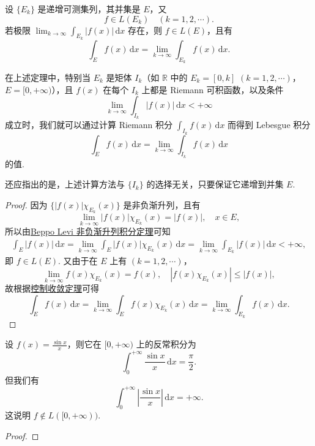 \documentclass[../../main.tex]{subfiles}%
\begin{document}
\begin{theorem}
设 \( \{ E_k \} \) 是递增可测集列，其并集是 \( E \)，又
\[
f \in L(E_k) \quad (k = 1, 2, \cdots).
\]
若极限 \( \lim_{k \to \infty} \int_{E_k} |f(x)| \, \mathrm{d}x \) 存在，则 \( f \in L(E) \)，且有
\[
\int_E f(x) \, \mathrm{d}x = \lim_{k \to \infty} \int_{E_k} f(x) \, \mathrm{d}x.
\]
\end{theorem}
\begin{remark}
在上述定理中，特别当 \( E_k \) 是矩体 \( I_k \)（如 \( \mathbb{R} \) 中的 \( E_k = [0, k] \) \( (k = 1, 2, \cdots) \)，\( E = [0, +\infty) \)），且 \( f(x) \) 在每个 \( I_k \) 上都是 Riemann 可积函数，以及条件
\[
\lim_{k \to \infty} \int_{I_k} |f(x)| \, \mathrm{d}x < +\infty
\]
成立时，我们就可以通过计算 Riemann 积分 \( \int_{I_k} f(x) \, \mathrm{d}x \) 而得到 Lebesgue 积分
\[
\int_E f(x) \, \mathrm{d}x = \lim_{k \to \infty} \int_{I_k} f(x) \, \mathrm{d}x
\]
的值.

还应指出的是，上述计算方法与 \( \{ I_k \} \) 的选择无关，只要保证它递增到并集 \( E \).
\end{remark}
\begin{proof}
因为 \( \{ |f(x)| \chi_{E_k}(x) \} \) 是非负渐升列，且有
\[
\lim_{k \to \infty} |f(x)| \chi_{E_k}(x) = |f(x)|, \quad x \in E,
\]
所以由\hyperref[theorem:Beppo Levi非负渐升列积分定理]{Beppo Levi 非负渐升列积分定理}可知
\begin{align*}
\int_E |f(x)| \, \mathrm{d}x = \lim_{k \to \infty} \int_E |f(x)| \chi_{E_k}(x) \, \mathrm{d}x = \lim_{k \to \infty} \int_{E_k} |f(x)| \, \mathrm{d}x < +\infty,
\end{align*}
即 \( f \in L(E) \). 又由于在 \( E \) 上有 \( (k = 1, 2, \cdots) \)，
\[
\lim_{k \to \infty} f(x) \chi_{E_k}(x) = f(x), \quad |f(x) \chi_{E_k}(x)| \leqslant |f(x)|,
\]
故根据\hyperref[theorem:控制收敛定理]{控制收敛定理}可得
\[
\int_E{f(x)\,\mathrm{d}x}=\lim_{k\rightarrow \infty} \int_E{f(x)\chi _{E_k}\left( x \right) \,\mathrm{d}x}=\lim_{k\rightarrow \infty} \int_{E_k}{f(x)\,\mathrm{d}x}.
\]
\end{proof}

\begin{example}
设 \( f(x) = \frac{\sin x}{x} \)，则它在 \( [0, +\infty) \) 上的反常积分为
\[
\int_0^{+\infty} \frac{\sin x}{x} \, \mathrm{d}x = \frac{\pi}{2}.
\]
但我们有
\[
\int_0^{+\infty} \left| \frac{\sin x}{x} \right| \, \mathrm{d}x = +\infty.
\]
这说明 \( f \notin L([0, +\infty)) \).
\end{example}
\begin{proof}

\end{proof}
\end{document}
